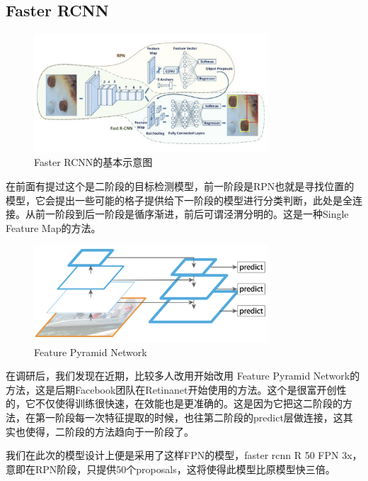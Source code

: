 \documentclass[journal,transmag]{IEEEtran}
\begin{document}
\subsection{Faster RCNN}
\begin{figure}[h]
\centering
\includegraphics[width=3.44in]{B.bmp}
\caption{Faster RCNN的基本示意图}
\end{figure}

在前面有提过这个是二阶段的目标检测模型，前一阶段是RPN也就是寻找位置的模型，它会提出一些可能的格子提供给下一阶段的模型进行分类判断，此处是全连接。从前一阶段到后一阶段是循序渐进，前后可谓泾渭分明的。这是一种Single Feature Map的方法。

\begin{figure}[h]
\centering
\includegraphics[width=3.44in]{b2.bmp}
\caption{Feature Pyramid Network}
\end{figure}

在调研后，我们发现在近期，比较多人改用开始改用 Feature Pyramid Network的方法，这是后期Facebook团队在Retinanet开始使用的方法。这个是很富开创性的，它不仅使得训练很快速，在效能也是更准确的。这是因为它把这二阶段的方法，在第一阶段每一次特征提取的时候，也往第二阶段的predict层做连接，这其实也使得，二阶段的方法趋向于一阶段了。

我们在此次的模型设计上便是采用了这样FPN的模型，faster rcnn R 50 FPN 3x，意即在RPN阶段，只提供50个proposals，这将使得此模型比原模型快三倍。
\end{document}
